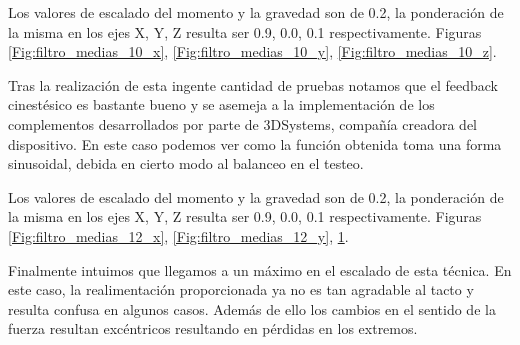Los valores de escalado del momento y la gravedad son de 0.2, la ponderación de la misma en los ejes X, Y, Z resulta ser 0.9, 0.0, 0.1 respectivamente. Figuras \ref{Fig:filtro_medias_10_x},  \ref{Fig:filtro_medias_10_y},  \ref{Fig:filtro_medias_10_z}.

Tras la realización de esta ingente cantidad de pruebas notamos que el feedback cinestésico es bastante bueno y se asemeja a la implementación de los complementos desarrollados por parte de 3DSystems, compañía creadora del dispositivo. En este caso podemos ver como la función obtenida toma una forma sinusoidal, debida en cierto modo al balanceo en el testeo.

\bigskip
\bigskip
\bigskip
\bigskip
\bigskip
\bigskip
\bigskip
\bigskip
\bigskip
\bigskip

\begin{figure}[!htb]
   \begin{minipage}{0.33\textwidth}
     \centering
         \caption{ }\label{Fig:filtro_medias_12_x}
   \end{minipage}\hfill
   \begin{minipage}{0.33\textwidth}
     \centering
         \caption{ }\label{Fig:filtro_medias_12_y}
   \end{minipage}
   \begin{minipage}{0.33\textwidth}
     \centering
         \caption{ }\label{Fig:filtro_medias_12_z}
   \end{minipage}\hfill
\end{figure}
Los valores de escalado del momento y la gravedad son de 0.2, la ponderación de la misma en los ejes X, Y, Z resulta ser 0.9, 0.0, 0.1 respectivamente. Figuras \ref{Fig:filtro_medias_12_x},  \ref{Fig:filtro_medias_12_y},  \ref{Fig:filtro_medias_12_z}.

Finalmente intuimos que llegamos a un máximo en el escalado de esta técnica. En este caso, la realimentación proporcionada ya no es tan agradable al tacto y resulta confusa en algunos casos. Además de ello los cambios en el sentido de la fuerza resultan excéntricos resultando en pérdidas en los extremos.

